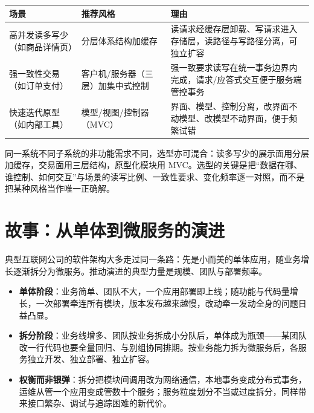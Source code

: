 \documentclass[
]{ctexbook}
\providecommand{\tightlist}{\setlength{\itemsep}{0pt}\setlength{\parskip}{0pt} }
\newcounter{none}
\begin{document}
{\def\LTcaptype{none} %
\begin{longtable}[]{@{}
  >{\raggedright\arraybackslash}p{}
  >{\raggedright\arraybackslash}p{}
  >{\raggedright\arraybackslash}p{}@{}}
\toprule\noalign{}
\begin{minipage}[b]{\linewidth}\raggedright
场景
\end{minipage} & \begin{minipage}[b]{\linewidth}\raggedright
推荐风格
\end{minipage} & \begin{minipage}[b]{\linewidth}\raggedright
理由
\end{minipage} \\
\midrule\noalign{}
\endhead
\bottomrule\noalign{}
\endlastfoot
高并发读多写少（如商品详情页） & 分层体系结构加缓存 &
读请求经缓存层卸载、写请求进入存储层，读路径与写路径分离，可独立扩容 \\
强一致性交易（如订单支付） & 客户机/服务器（三层）加集中式控制 &
强一致要求读写在统一事务边界内完成，请求/应答式交互便于服务端管控事务 \\
快速迭代原型（如内部工具） & 模型/视图/控制器（MVC） &
界面、模型、控制分离，改界面不动模型、改模型不动界面，便于频繁试错 \\
\end{longtable}
}

同一系统不同子系统的非功能需求不同，选型亦可混合：读多写少的展示面用分层加缓存，交易面用三层结构，原型化模块用
MVC。选型的关键是把``数据在哪、谁控制、如何交互''与场景的读写比例、一致性要求、变化频率逐一对照，而不是把某种风格当作唯一正确解。

\section{故事：从单体到微服务的演进}\label{ux6545ux4e8bux4eceux5355ux4f53ux5230ux5faeux670dux52a1ux7684ux6f14ux8fdb}

典型互联网公司的软件架构大多走过同一条路：先是小而美的单体应用，随业务增长逐渐拆分为微服务。推动演进的典型力量是规模、团队与部署频率。

\begin{itemize}
\tightlist
\item
  \textbf{单体阶段}：业务简单、团队不大，一个应用部署即上线；随功能与代码量增长，一次部署牵连所有模块，版本发布越来越慢，改动牵一发动全身的问题日益凸显。
\item
  \textbf{拆分阶段}：业务线增多、团队按业务拆成小分队后，单体成为瓶颈------某团队改一行代码也要全量回归、与别组协同排期。按业务能力拆为微服务后，各服务独立开发、独立部署、独立扩容。
\item
  \textbf{权衡而非银弹}：拆分把模块间调用改为网络通信，本地事务变成分布式事务，运维从管一个应用变成管数十个服务；服务粒度划分不当或过度拆分，同样带来接口繁杂、调试与追踪困难的新代价。
\end{itemize}
\end{document}
